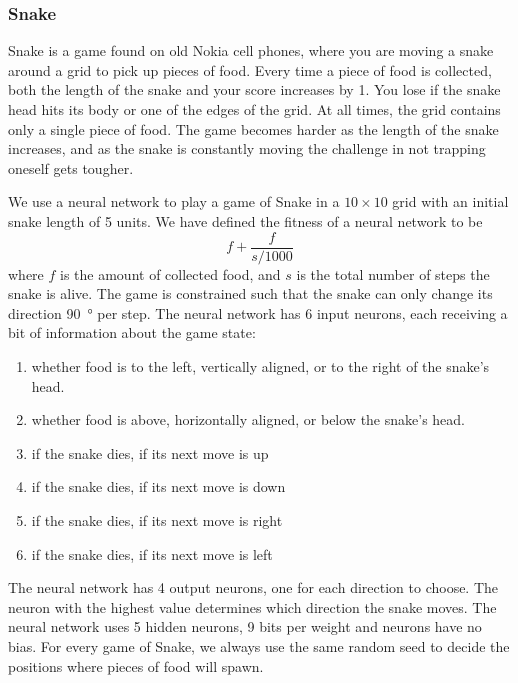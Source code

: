 \subsubsection{Snake}
Snake is a game found on old Nokia cell phones, where you are moving a snake around a grid to pick up pieces of food.
Every time a piece of food is collected, both the length of the snake and your score increases by 1.
You lose if the snake head hits its body or one of the edges of the grid.
At all times, the grid contains only a single piece of food.
The game becomes harder as the length of the snake increases, and as the snake is constantly moving the challenge in not trapping oneself gets tougher.

We use a neural network to play a game of Snake in a $10\times10$ grid with an initial snake length of 5 units.
We have defined the fitness of a neural network to be 
\[
  f + \frac{f}{s/1000}
\]
where $f$ is the amount of collected food, and $s$ is the total number of steps the snake is alive. The game is constrained such that the snake can only change its direction \SI{90}{\degree} per step. The neural network has 6 input neurons, each receiving a bit of information about the game state:
\begin{enumerate}
  \item {} whether food is to the left, vertically aligned, or to the right of the snake's head.
  \item {} whether food is above, horizontally aligned, or below the snake's head.
  \item {} if the snake dies, if its next move is up
  \item {} if the snake dies, if its next move is down
  \item {} if the snake dies, if its next move is right 
  \item {} if the snake dies, if its next move is left
\end{enumerate}
The neural network has 4 output neurons, one for each direction to choose. The neuron with the highest value determines which direction the snake moves.
The neural network uses 5 hidden neurons, 9 bits per weight and neurons have no bias.
For every game of Snake, we always use the same random seed to decide the positions where pieces of food will spawn.
